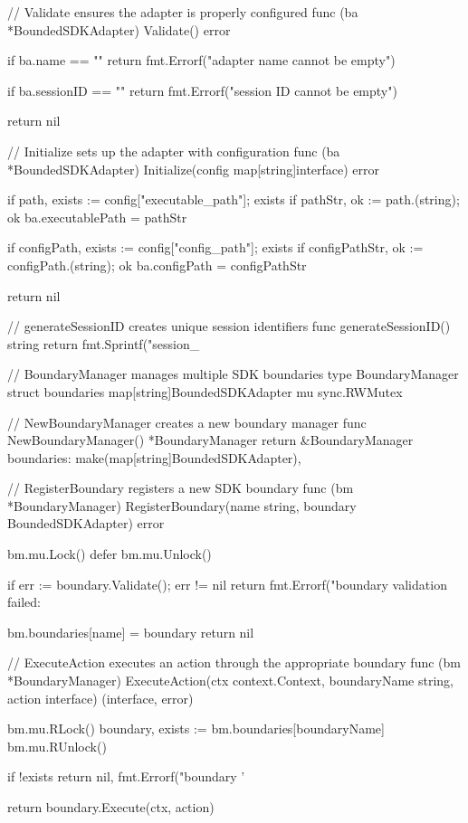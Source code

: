 {// Validate ensures the adapter is properly configured
func (ba *BoundedSDKAdapter) Validate() error {
    if ba.name == "" {
        return fmt.Errorf("adapter name cannot be empty")
    }

    if ba.sessionID == "" {
        return fmt.Errorf("session ID cannot be empty")
    }

    return nil
}

// Initialize sets up the adapter with configuration
func (ba *BoundedSDKAdapter) Initialize(config map[string]interface{}) error {
    if path, exists := config["executable_path"]; exists {
        if pathStr, ok := path.(string); ok {
            ba.executablePath = pathStr
        }
    }

    if configPath, exists := config["config_path"]; exists {
        if configPathStr, ok := configPath.(string); ok {
            ba.configPath = configPathStr
        }
    }

    return nil
}

// generateSessionID creates unique session identifiers
func generateSessionID() string {
    return fmt.Sprintf("session_%
}

// BoundaryManager manages multiple SDK boundaries
type BoundaryManager struct {
    boundaries map[string]BoundedSDKAdapter
    mu         sync.RWMutex
}

// NewBoundaryManager creates a new boundary manager
func NewBoundaryManager() *BoundaryManager {
    return &BoundaryManager{
        boundaries: make(map[string]BoundedSDKAdapter),
    }
}

// RegisterBoundary registers a new SDK boundary
func (bm *BoundaryManager) RegisterBoundary(name string, boundary BoundedSDKAdapter) error {
    bm.mu.Lock()
    defer bm.mu.Unlock()

    if err := boundary.Validate(); err != nil {
        return fmt.Errorf("boundary validation failed: %
    }

    bm.boundaries[name] = boundary
    return nil
}

// ExecuteAction executes an action through the appropriate boundary
func (bm *BoundaryManager) ExecuteAction(ctx context.Context, boundaryName string, action interface{}) (interface{}, error) {
    bm.mu.RLock()
    boundary, exists := bm.boundaries[boundaryName]
    bm.mu.RUnlock()

    if !exists {
        return nil, fmt.Errorf("boundary '%
    }

    return boundary.Execute(ctx, action)
}


}

